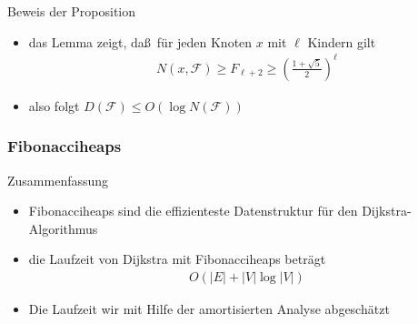 \documentclass[aspectratio=1610, 11pt]{beamer}
\newcommand\cF{\mathcal F}
\newcommand\bc[1]{\left({#1}\right)}
\newcommand\bcfr[2]{\bc{\frac{#1}{#2}}}
\newcommand{\mytitle}{Fibonacciheaps}
\begin{document}
\begin{frame}
\begin{overprint}
\begin{exampleblock}{Beweis der Proposition}
\begin{itemize}
				\item das Lemma zeigt, da\ss\ f\"ur jeden Knoten $x$ mit $\ell$ Kindern gilt
					\begin{align*}
						N(x,\cF)\geq F_{\ell+2}\geq\bcfr{1+\sqrt 5}2^\ell
					\end{align*}
				\item also folgt $D(\cF)\leq O(\log N(\cF))$
			\end{itemize}
		\end{exampleblock}
	\end{overprint}
\end{frame}

\begin{frame}\frametitle{\mytitle}
	\begin{overprint}
		\begin{exampleblock}{Zusammenfassung}
			\begin{itemize}
				\item Fibonacciheaps sind die effizienteste Datenstruktur f\"ur den Dijkstra-Algorithmus
				\item die Laufzeit von Dijkstra mit Fibonacciheaps betr\"agt
					\begin{align*}
						O(|E|+|V|\log|V|)
					\end{align*}
				\item Die Laufzeit wir mit Hilfe der \alert{amortisierten Analyse} abgesch\"atzt
			\end{itemize}
		\end{exampleblock}
	\end{overprint}
\end{frame}
\end{document}
